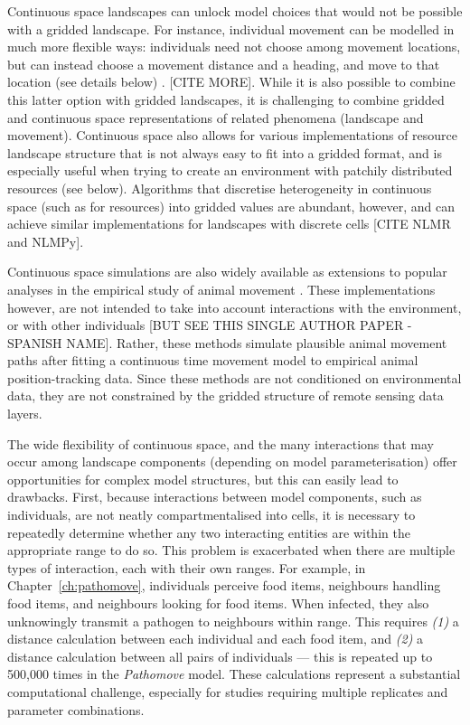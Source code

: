 Continuous space landscapes can unlock model choices that would not be possible with a gridded landscape.
For instance, individual movement can be modelled in much more flexible ways: individuals need not choose among movement locations, but can instead choose a movement distance and a heading, and move to that location (see details below) \citep{spiegel2017,mueller2011}. [CITE MORE].
While it is also possible to combine this latter option with gridded landscapes, it is challenging to combine gridded and continuous space representations of related phenomena (landscape and movement).
Continuous space also allows for various implementations of resource landscape structure that is not always easy to fit into a gridded format, and is especially useful when trying to create an environment with patchily distributed resources (see below).
Algorithms that discretise heterogeneity in continuous space (such as for resources) into gridded values are abundant, however, and can achieve similar implementations for landscapes with discrete cells [CITE NLMR and NLMPy].

Continuous space simulations are also widely available as extensions to popular analyses in the empirical study of animal movement \citep{noonan2019,calabrese2016,calabrese2018,fleming2014,fleming2015,gurarie2017,gurarie2016}.
These implementations however, are not intended to take into account interactions with the environment, or with other individuals [BUT SEE THIS SINGLE AUTHOR PAPER - SPANISH NAME].
Rather, these methods simulate plausible animal movement paths after fitting a continuous time movement model to empirical animal position-tracking data.
Since these methods are not conditioned on environmental data, they are not constrained by the gridded structure of remote sensing data layers.

The wide flexibility of continuous space, and the many interactions that may occur among landscape components (depending on model parameterisation) offer opportunities for complex model structures, but this can easily lead to drawbacks.
First, because interactions between model components, such as individuals, are not neatly compartmentalised into cells, it is necessary to repeatedly determine whether any two interacting entities are within the appropriate range to do so.
This problem is exacerbated when there are multiple types of interaction, each with their own ranges.
For example, in Chapter~\ref{ch:pathomove}, individuals perceive food items, neighbours handling food items, and neighbours looking for food items.
When infected, they also unknowingly transmit a pathogen to neighbours within range.
This requires \emph{(1)} a distance calculation between each individual and each food item, and \emph{(2)} a distance calculation between all pairs of individuals --- this is repeated up to 500,000 times in the \emph{Pathomove} model.
These calculations represent a substantial computational challenge, especially for studies requiring multiple replicates and parameter combinations.

